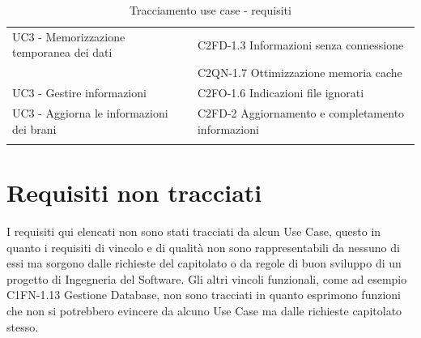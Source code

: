 \begin{footnotesize}
\begin{longtable}[!h]{|l|l|}
UC3 - Memorizzazione temporanea dei dati & C2FD-1.3 Informazioni senza
connessione \\
 & C2QN-1.7 Ottimizzazione memoria cache \\ \hline
UC3 - Gestire informazioni & C2FO-1.6 Indicazioni file ignorati \\ \hline
UC3 - Aggiorna le informazioni dei brani & C2FD-2 Aggiornamento e completamento
informazioni \\ \hline
\caption{Tracciamento use case - requisiti}
\end{longtable}
\end{footnotesize}

\newpage
\section{Requisiti non tracciati}

I requisiti qui elencati non sono stati tracciati da alcun Use Case, questo in
quanto i requisiti di vincolo e di qualit\`a non sono rappresentabili da nessuno
di essi ma sorgono dalle richieste del capitolato o da regole di buon sviluppo
di un progetto di Ingegneria del Software.
Gli altri vincoli funzionali, come ad esempio C1FN-1.13 Gestione Database, non sono
tracciati in quanto esprimono funzioni che non si potrebbero evincere da alcuno Use
Case ma dalle richieste capitolato stesso.


